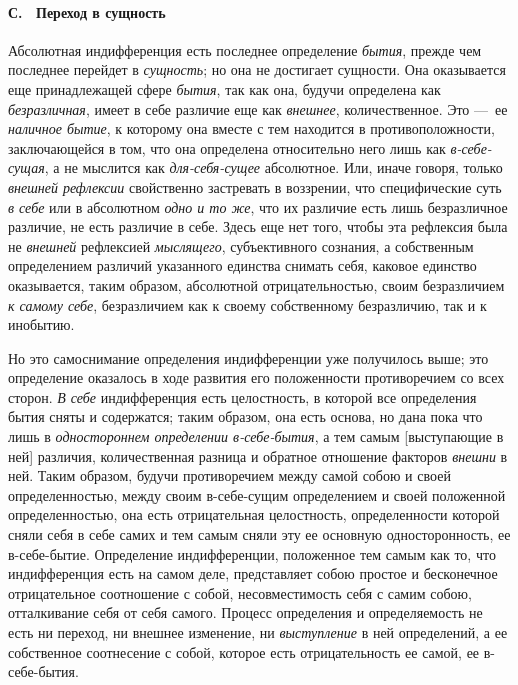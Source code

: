 \paragraph[С. \ Переход в сущность]{С. \ Переход в сущность}
Абсолютная индифференция есть последнее
определение {\em бытия}, прежде чем последнее перейдет
в {\em сущность}; но она не достигает сущности. Она
оказывается еще принадлежащей сфере {\em бытия}, так
как она, будучи определена как {\em безразличная},
имеет в себе различие еще как {\em внешнее},
количественное. Это —~ее {\em наличное бытие}, к
которому она вместе с тем находится в противоположности, заключающейся в
том, что она определена относительно него лишь как
{\em в-себе-сущая}, а не мыслится как
{\em для-себя-сущее} абсолютное. Или, иначе говоря,
только {\em внешней рефлексии} свойственно застревать в
воззрении, что специфические суть {\em в себе} или в
абсолютном {\em одно и то же}, что их различие есть
лишь безразличное различие, не есть различие в себе. Здесь еще нет того,
чтобы эта рефлексия была не {\em внешней} рефлексией
{\em мыслящего}, субъективного сознания, а собственным
определением различий указанного единства снимать себя, каковое единство
оказывается, таким образом, абсолютной отрицательностью, своим безразличием
{\em к самому себе}, безразличием как к своему
собственному безразличию, так и к инобытию.

Но это самоснимание определения индифференции уже получилось выше; это
определение оказалось в ходе развития его положенности противоречием со
всех сторон. {\em В себе} индифференция есть
целостность, в которой все определения бытия сняты и содержатся; таким
образом, она есть основа, но дана пока что лишь в
{\em одностороннем определении в-себе-бытия}, а тем
самым [выступающие в ней] различия, количественная разница и обратное
отношение факторов {\em внешни} в ней. Таким образом,
будучи противоречием между самой собою и своей определенностью, между своим
в-себе-сущим определением и своей положенной определенностью, она есть
отрицательная целостность, определенности которой сняли себя в себе самих и
тем самым сняли эту ее основную односторонность, ее в-себе-бытие.
Определение индифференции, положенное тем самым как то, что индифференция
есть на самом деле, представляет собою простое и бесконечное отрицательное
соотношение с собой, несовместимость себя с самим собою, отталкивание себя
от себя самого. Процесс определения и определяемость не есть ни переход, ни
внешнее изменение, ни {\em выступление} в ней
определений, а ее собственное соотнесение с собой, которое есть
отрицательность ее самой, ее в-себе-бытия.

